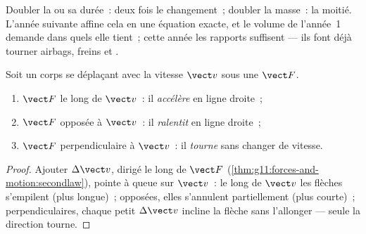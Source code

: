 \begin{remark}
Doubler la  ou sa durée~: deux fois le
changement~; doubler la masse~: la moitié. L'année suivante affine cela
en une équation exacte, et le volume de l'année~1 demande dans quels
 elle tient~; cette année les rapports suffisent --- ils
font déjà tourner airbags, freins et
.
\end{remark}

\begin{proposition}\label{prop:g11:forces-and-motion:cases}
Soit un corps se déplaçant avec la vitesse $\vect v$ sous une
 $\vect F$.
\begin{enumerate}
  \item $\vect F$ le long de $\vect v$~: il \emph{accélère} en ligne
        droite~;
  \item $\vect F$ opposée à $\vect v$~: il \emph{ralentit} en ligne
        droite~;
  \item $\vect F$ perpendiculaire à $\vect v$~: il \emph{tourne} sans
        changer de vitesse.
\end{enumerate}
\end{proposition}

\begin{proof}
Ajouter $\Delta\vect v$, dirigé le long de $\vect F$
(\cref{thm:g11:forces-and-motion:secondlaw}), pointe à queue sur
$\vect v$~: le long de $\vect v$ les flèches s'empilent (plus
longue)~; opposées, elles s'annulent partiellement (plus courte)~;
perpendiculaires, chaque petit $\Delta \vect v$ incline la flèche sans
l'allonger --- seule la direction tourne.
\end{proof}

